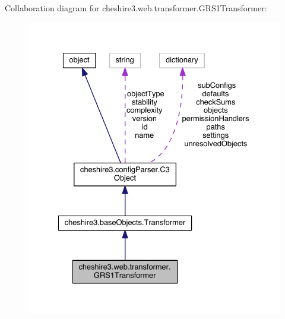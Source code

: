 Collaboration diagram for cheshire3.\-web.\-transformer.\-G\-R\-S1\-Transformer\-:
\nopagebreak
\begin{figure}[H]
\begin{center}
\leavevmode
\includegraphics[width=331pt]{classcheshire3_1_1web_1_1transformer_1_1_g_r_s1_transformer__coll__graph}
\end{center}
\end{figure}
